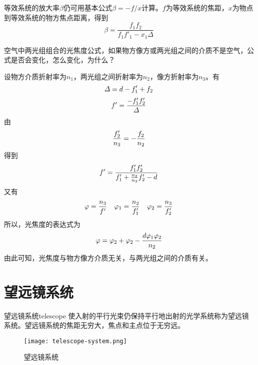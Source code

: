 \documentclass[cn,10pt,chinesefont=founder,math=newtx,cite=super,twoside]{elegantbook}
\begin{document}
等效系统的放大率$\beta$仍可用基本公式$\beta=-f/x$计算。$f$为等效系统的焦距，$x$为物点到等效系统的物方焦点距离，得到
\begin{equation}
\beta=\frac{f_1f_2}{f_1f'_1-x_1\varDelta}
\end{equation}

\begin{problem}
	空气中两光组组合的光焦度公式，如果物方像方或两光组之间的介质不是空气，公式是否会变化，怎么变化，为什么？
\end{problem}
\begin{solution}
	设物方介质折射率为$n_1$，两光组之间折射率为$n_2$，像方折射率为$n_3$。有
	\begin{equation}
	\varDelta=d-f'_1+f_2\notag
	\end{equation}
	\begin{equation}
	f'=\frac{-f'_1f'_2}{\varDelta}\notag
	\end{equation}
	由
	\begin{equation}
	\frac{f'_2}{n_3}=-\frac{f_2}{n_2}\notag
	\end{equation}
	得到
	\begin{equation}
	f'=\frac{f'_1f'_2}{f'_1+\frac{n_2}{n_3}f'_2-d}\notag
	\end{equation}
	又有
	\begin{equation}
	\varphi=\frac{n_3}{f'}\quad\varphi_1=\frac{n_2}{f'_1}\quad\varphi_2=\frac{n_3}{f'_2}\notag
	\end{equation}
	所以，光焦度的表达式为
	\begin{equation}
	\varphi=\varphi_2+\varphi_2-\frac{d\varphi_1\varphi_2}{n_2}\notag
	\end{equation}
	由此可知，光焦度与物方像方介质无关，与两光组之间的介质有关。
\end{solution}

\section{望远镜系统}

\begin{definition}{望远镜系统}{telescope}
	使入射的平行光束仍保持平行地出射的光学系统称为望远镜系统。望远镜系统的焦距无穷大，焦点和主点位于无穷远。
\end{definition}

\begin{figure}[htbp]
	\centering
	\texttt{[image: telescope-system.png]}
	\caption{望远镜系统}
	\label{fig:telescope-system}
\end{figure}
\end{document}
